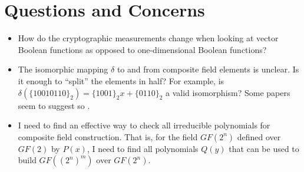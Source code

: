 \documentclass[10pt]{article}
\begin{document}
\section{Questions and Concerns}
\begin{itemize}
	\item How do the cryptographic measurements change when looking at vector Boolean functions as opposed to one-dimensional Boolean functions? 
	\item The isomorphic mapping $\delta$ to and from composite field elements is unclear. Is it enough to ``split'' the elements in half? For example, is $\delta(\{10010110\}_2) = \{1001\}_2x + \{0110\}_2$ a valid isomorphism? Some papers seem to suggest so \cite{mui2007practical}.
	\item I need to find an effective way to check all irreducible polynomials for composite field construction. That is, for the field $GF(2^n)$ defined over $GF(2)$ by $P(x)$, I need to find all polynomials $Q(y)$ that can be used to build $GF((2^n)^m)$ over $GF(2^n)$. 
\end{itemize}



\end{document}
